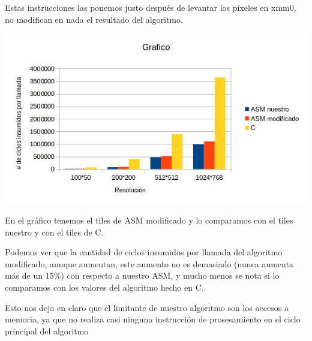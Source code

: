 Estas instrucciones las ponemos justo después de levantar los píxeles en xmm0, no modifican en 
nada el resultado del algoritmo.\vspace*{0.3cm} \noindent

\begin{center}
 \includegraphics[scale=0.7]{tilesmod.jpg}
\end{center}

En el gráfico tenemos el tiles de ASM modificado y lo comparamos con el tiles nuestro y con el tiles de C.\vspace*{0.3cm} \noindent

Podemos ver que la cantidad de ciclos insumidos por llamada del algoritmo modificado, aunque aumentan, 
este aumento no es demasiado (nunca aumenta más de un 15\%) con respecto a nuestro ASM, y mucho menos se 
nota si lo comparamos con los valores del algoritmo hecho en C. \vspace*{0.3cm} \noindent

Esto nos deja en claro que el limitante de nuestro algoritmo son los accesos a memoria, ya que no realiza 
casi ninguna instrucción de prosesamiento en el ciclo principal del algoritmo \vspace*{0.3cm} \noindent

